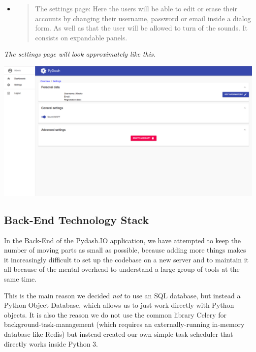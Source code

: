 \begin{itemize}
\item
  \begin{quote}
  The settings page: Here the users will be able to edit or erase their
  accounts by changing their username, password or email inside a dialog
  form. As well as that the user will be allowed to turn of the sounds.
  It consists on expandable panels.
  \end{quote}
\end{itemize}

\emph{The settings page will look approximately like this.}


\includegraphics[width=\pagewidth]{media/image38.png}


\hypertarget{back-end-technology-stack}{%
\subsection{Back-End Technology Stack}\label{back-end-technology-stack}}

In the Back-End of the Pydash.IO application, we have attempted to keep
the number of moving parts as small as possible, because adding more
things makes it increasingly difficult to set up the codebase on a new
server and to maintain it all because of the mental overhead to
understand a large group of tools at the same time.

This is the main reason we decided \emph{not} to use an SQL database,
but instead a Python Object Database, which allows us to just work
directly with Python objects. It is also the reason we do not use the
common library Celery for background-task-management (which requires an
externally-running in-memory database like Redis) but instead created
our own simple task scheduler that directly works inside Python 3.

